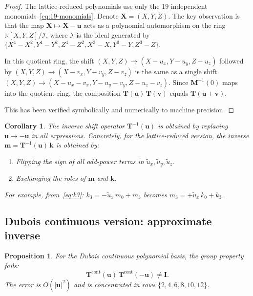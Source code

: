 \documentclass[11pt,a4paper]{article}
\newtheorem{proposition}{Proposition}[section]
\newtheorem{corollary}{Corollary}[section]
\newcommand{\vect}[1]{\bm{#1}}
\newcommand{\mat}[1]{\bm{#1}}
\newcommand{\Tmat}{\mat{T}}
\newcommand{\Mmat}{\mat{M}}
\newcommand{\Imat}{\mat{I}}
\newcommand{\tu}{\tilde{u}}
\newcommand{\Real}{\mathbb{R}}
\begin{document}
\begin{proof}
The lattice-reduced polynomials use only the 19 independent monomials~\eqref{eq:19-monomials}.
Denote $\vect{X} = (X,Y,Z)$.
The key observation is that the map $\vect{X} \mapsto \vect{X} - \vect{u}$ acts as a polynomial automorphism on the ring $\Real[X,Y,Z] / \mathcal{I}$, where $\mathcal{I}$ is the ideal generated by $\{X^4 - X^2, Y^4 - Y^2, Z^4 - Z^2, X^3 - X, Y^3 - Y, Z^3 - Z\}$.

In this quotient ring, the shift $(X,Y,Z) \to (X-u_x, Y-u_y, Z-u_z)$ followed by $(X,Y,Z) \to (X-v_x, Y-v_y, Z-v_z)$ is the same as a single shift $(X,Y,Z) \to (X-u_x-v_x, Y-u_y-v_y, Z-u_z-v_z)$.
Since $\Mmat^{-1}(0)$ maps into the quotient ring, the composition $\Tmat(\vect{u})\,\Tmat(\vect{v})$ equals $\Tmat(\vect{u}+\vect{v})$.

This has been verified symbolically and numerically to machine precision.
\end{proof}

\begin{corollary}
The inverse shift operator $\Tmat^{-1}(\vect{u})$ is obtained by replacing $\vect{u} \to -\vect{u}$ in all expressions.
Concretely, for the lattice-reduced version, the inverse $\vect{m} = \Tmat^{-1}(\vect{u})\,\vect{k}$ is obtained by:
\begin{enumerate}[nosep]
  \item Flipping the sign of all odd-power terms in $\tu_x, \tu_y, \tu_z$.
  \item Exchanging the roles of $\vect{m}$ and $\vect{k}$.
\end{enumerate}
For example, from~\eqref{eq:k3}: $k_3 = -\tu_x\,m_0 + m_3$ becomes $m_3 = +\tu_x\,k_0 + k_3$.
\end{corollary}

\subsection{Dubois continuous version: approximate inverse}

\begin{proposition}\label{prop:dubois-no-group}
For the Dubois continuous polynomial basis, the group property fails:
\begin{equation}
  \Tmat^{\text{cont}}(\vect{u})\,\Tmat^{\text{cont}}(-\vect{u}) \neq \Imat.
\end{equation}
The error is $O(|\vect{u}|^2)$ and is concentrated in rows $\{2, 4, 6, 8, 10, 12\}$.
\end{proposition}
\end{document}
